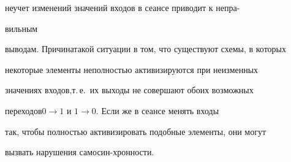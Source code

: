 неучет изменений значений входов в сеансе приводит к непра-\linebreak\vspace*{-12pt}







\noindent


вильным 


выводам. Причина\linebreak такой ситуации в том, что существуют схемы, в которых\linebreak 


некоторые элементы неполностью активизируются при неизменных 


значениях входов,\linebreak т.\,е.\ их выходы не совершают обоих возможных 


переходов\linebreak $0\rightarrow 1$ и $1\rightarrow 0$. Если же в сеансе менять входы 


так, чтобы полностью активизировать подобные элементы, они могут\linebreak 


вызвать нарушения самосин-\linebreak хронности.





